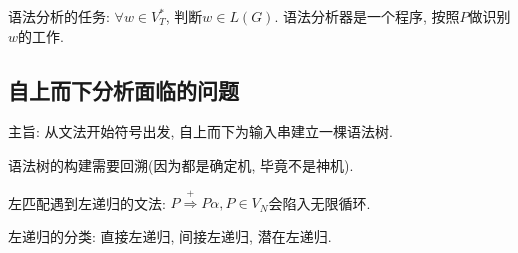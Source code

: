     语法分析的任务: $\forall w\in V_T^*$, 判断$w\in L(G)$. 语法分析器是一个程序, 按照$P$做识别$w$的工作.

    \subsection{自上而下分析面临的问题}

        主旨: 从文法开始符号出发, 自上而下为输入串建立一棵语法树. 

        语法树的构建需要回溯(因为都是确定机, 毕竟不是神机).

        左匹配遇到\textsf{左递归}的文法: $P\stackrel{+}{\Rightarrow}P\alpha, P\in V_N$会陷入无限循环.

        左递归的分类: 直接左递归, 间接左递归, 潜在左递归.
